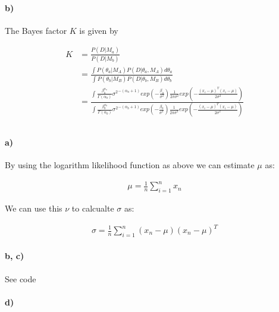 \documentclass{article}
\begin{document}
\paragraph{b)}

The Bayes factor $K$ is given by

\begin{align*}
  K &= \frac{P \left( D \vert M_a \right)}{P \left( D \vert M_b \right)} \\
  &= \frac{ \int P \left( \theta_a \vert M_A \right) P \left( D \vert \theta_a , M_A \right) d \theta_a}
  { \int P \left( \theta_b \vert M_B \right) P \left( D \vert \theta_b , M_B \right) d \theta_b} \\
  &= \frac{ \int \frac{\beta_{a}^{\alpha_a}}{\Gamma (\alpha_a)}
    {\sigma^2}^{-(\alpha_a + 1)} exp \left( - \frac{\beta_a}{\sigma^2} \right)
    \frac{1}{2\pi\sigma^2}
    exp{\left( - \frac{(x_i - \mu)^T(x_i - \mu)}{2\sigma^2} \right)}}
    { \int \frac{\beta_{b}^{\alpha_b}}{\Gamma (\alpha_b)}
    {\sigma^2}^{-(\alpha_b + 1)} exp \left( - \frac{\beta_b}{\sigma^2} \right)
    \frac{1}{2\pi\sigma^2}
    exp{\left( - \frac{(x_i - \mu)^T(x_i - \mu)}{2\sigma^2} \right)}}
\end{align*}

\setcounter{section}{2}
\setcounter{subsection}{0}
\subsection{}
\paragraph{a)}

By using the logarithm likelihood function as above we can estimate $\mu$ as:

\begin{align}
  \mu = \frac{1}{n} \sum_{i = 1}^{n} x_n
\end{align}

We can use this $\nu$ to calcualte $\sigma$ as:

\begin{align}
  \sigma = \frac{1}{n} \sum_{i = 1}^{n} (x_n - \mu)(x_n - \mu)^T
\end{align}

\paragraph{b, c)}
See code

\paragraph{d)}
\end{document}
